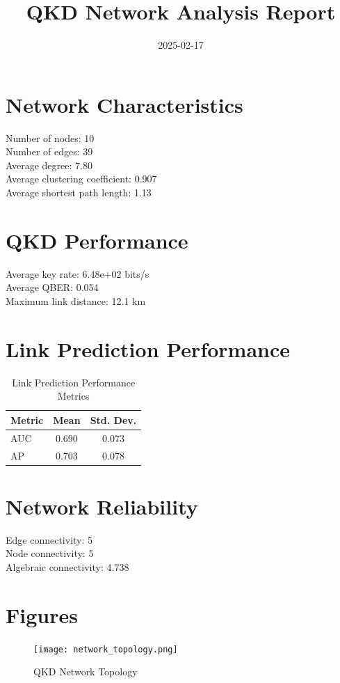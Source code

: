 \documentclass{article}
\title{QKD Network Analysis Report}
\date{2025-02-17}
\begin{document}
    \maketitle

    \section{Network Characteristics}
    Number of nodes: 10 \\
    Number of edges: 39 \\
    Average degree: 7.80 \\
    Average clustering coefficient: 0.907 \\
    Average shortest path length: 1.13

    \section{QKD Performance}
    Average key rate: 6.48e+02 bits/s \\
    Average QBER: 0.054 \\
    Maximum link distance: 12.1 km

    \section{Link Prediction Performance}
    \begin{table}[H]
    \centering
    \begin{tabular}{lcc}
    \toprule
    Metric & Mean & Std. Dev. \\
    \midrule
    AUC & 0.690 &
        0.073 \\
    AP & 0.703 &
        0.078 \\
    \bottomrule
    \end{tabular}
    \caption{Link Prediction Performance Metrics}
    \end{table}

    \section{Network Reliability}
    Edge connectivity: 5 \\
    Node connectivity: 5 \\
    Algebraic connectivity: 4.738

    \section{Figures}
    \begin{figure}[H]
    \centering
    \texttt{[image: network\_topology.png]}
    \caption{QKD Network Topology}
    \end{figure}
\end{document}
